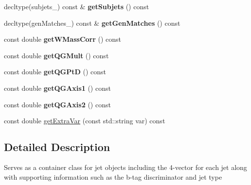 \begin{DoxyCompactItemize}
\item 
\hypertarget{classConstituent_a07f258d8045b1dc37fecf10b44448ba4}{decltype(subjets\-\_\-) const \& {\bfseries get\-Subjets} () const }\label{classConstituent_a07f258d8045b1dc37fecf10b44448ba4}

\item 
\hypertarget{classConstituent_a228e250e72e942fdea1681b410f4678d}{decltype(gen\-Matches\-\_\-) const \& {\bfseries get\-Gen\-Matches} () const }\label{classConstituent_a228e250e72e942fdea1681b410f4678d}

\item 
\hypertarget{classConstituent_a12e3cc549590ccd9ed002758be496e5a}{const double {\bfseries get\-W\-Mass\-Corr} () const }\label{classConstituent_a12e3cc549590ccd9ed002758be496e5a}

\item 
\hypertarget{classConstituent_a578e22ccced59fae6997602b9de2dd0d}{const double {\bfseries get\-Q\-G\-Mult} () const }\label{classConstituent_a578e22ccced59fae6997602b9de2dd0d}

\item 
\hypertarget{classConstituent_a27559533b8b7bf2186fd3b70bf007c9a}{const double {\bfseries get\-Q\-G\-Pt\-D} () const }\label{classConstituent_a27559533b8b7bf2186fd3b70bf007c9a}

\item 
\hypertarget{classConstituent_a63c5b69d47758409d408d1c00e6b5acd}{const double {\bfseries get\-Q\-G\-Axis1} () const }\label{classConstituent_a63c5b69d47758409d408d1c00e6b5acd}

\item 
\hypertarget{classConstituent_a98acdf1e7512b2668f9d5fb89b44ceb3}{const double {\bfseries get\-Q\-G\-Axis2} () const }\label{classConstituent_a98acdf1e7512b2668f9d5fb89b44ceb3}

\item 
const double \hyperlink{classConstituent_ac83cdd5829f544e5ad488c3b48b8cc08}{get\-Extra\-Var} (const std\-::string var) const 
\end{DoxyCompactItemize}


\subsection{Detailed Description}
Serves as a container class for jet objects including the 4-\/vector for each jet along with supporting information such as the b-\/tag discriminator and jet type 

